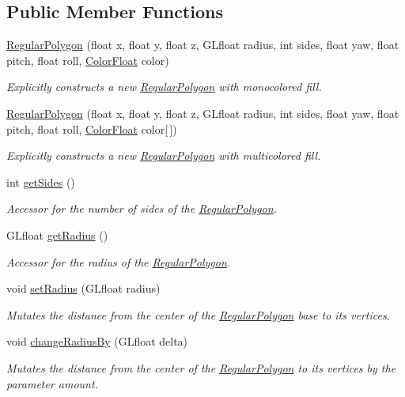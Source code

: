 \subsection*{Public Member Functions}
\begin{DoxyCompactItemize}
\item 
\hyperlink{classtsgl_1_1_regular_polygon_a084a058facd0ce8576c908227c912f72}{Regular\+Polygon} (float x, float y, float z, G\+Lfloat radius, int sides, float yaw, float pitch, float roll, \hyperlink{structtsgl_1_1_color_float}{Color\+Float} color)
\begin{DoxyCompactList}\small\item\em Explicitly constructs a new \hyperlink{classtsgl_1_1_regular_polygon}{Regular\+Polygon} with monocolored fill. \end{DoxyCompactList}\item 
\hyperlink{classtsgl_1_1_regular_polygon_aba7efbdad969dcd3a176b55bd8b545b0}{Regular\+Polygon} (float x, float y, float z, G\+Lfloat radius, int sides, float yaw, float pitch, float roll, \hyperlink{structtsgl_1_1_color_float}{Color\+Float} color\mbox{[}$\,$\mbox{]})
\begin{DoxyCompactList}\small\item\em Explicitly constructs a new \hyperlink{classtsgl_1_1_regular_polygon}{Regular\+Polygon} with multicolored fill. \end{DoxyCompactList}\item 
int \hyperlink{classtsgl_1_1_regular_polygon_ac3f500be681b6d43f75ec00bf5434be0}{get\+Sides} ()
\begin{DoxyCompactList}\small\item\em Accessor for the number of sides of the \hyperlink{classtsgl_1_1_regular_polygon}{Regular\+Polygon}. \end{DoxyCompactList}\item 
G\+Lfloat \hyperlink{classtsgl_1_1_regular_polygon_a97e19ebc76f1f22f5fee795d4d633aa0}{get\+Radius} ()
\begin{DoxyCompactList}\small\item\em Accessor for the radius of the \hyperlink{classtsgl_1_1_regular_polygon}{Regular\+Polygon}. \end{DoxyCompactList}\item 
void \hyperlink{classtsgl_1_1_regular_polygon_a3c4240fc8d95e6875fc716b26504000e}{set\+Radius} (G\+Lfloat radius)
\begin{DoxyCompactList}\small\item\em Mutates the distance from the center of the \hyperlink{classtsgl_1_1_regular_polygon}{Regular\+Polygon} base to its vertices. \end{DoxyCompactList}\item 
void \hyperlink{classtsgl_1_1_regular_polygon_af115ff2fbff6075dc965af51f7507bc9}{change\+Radius\+By} (G\+Lfloat delta)
\begin{DoxyCompactList}\small\item\em Mutates the distance from the center of the \hyperlink{classtsgl_1_1_regular_polygon}{Regular\+Polygon} to its vertices by the parameter amount. \end{DoxyCompactList}\end{DoxyCompactItemize}
